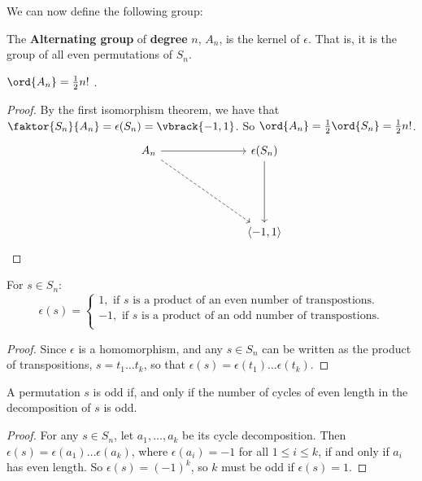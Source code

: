 We can now define the following group:

\begin{definition}
    The \textbf{Alternating group} of \textbf{degree} $n$,  $A_n$, is the kernel
    of  $\epsilon$. That is, it is the group of all even permutations of $S_n$.
\end{definition}

\begin{lemma}\label{3.6.4}
   $\ord{A_n}=\frac{1}{2}n!$ .
\end{lemma}
\begin{proof}
    By the first isomorphism theorem, we have that
    $\faktor{S_n}{A_n}=\epsilon(S_n)=\vbrack{-1,1}$. So
    $\ord{A_n}=\frac{1}{2}\ord{S_n}=\frac{1}{2}n!$.
\[\begin{tikzcd}
	{A_n} &&& {\epsilon(S_n)} \\
	\\
	\\
	&&& {\langle -1, 1 \rangle}
	\arrow[from=1-1, to=1-4]
	\arrow[from=1-4, to=4-4]
	\arrow[dashed, from=1-1, to=4-4]
\end{tikzcd}\]
\end{proof}
\begin{corollary}
    For $s \in S_n$:
    \begin{equation*}
        \epsilon(s)=\begin{cases}
                1, \text{ if } s \text{ is a product of an even number of
                transpostions.} \\
               -1, \text{ if } s \text{ is a product of an odd number of
               transpostions.} \\
             \end{cases}
    \end{equation*}
\end{corollary}
\begin{proof}
    Since $\epsilon$ is a homomorphism, and any $s \in S_n$ can be written as
    the product of transpositions, $s=t_1 \dots t_k$, so that
    $\epsilon(s)=\epsilon(t_1) \dots \epsilon(t_k)$.
\end{proof}

\begin{lemma}\label{3.6.5}
    A permutation $s$ is odd if, and only if the number of cycles of even length
    in the decomposition of $s$ is odd.
\end{lemma}
\begin{proof}
    For any $s \in S_n$, let  $a_1, \dots, a_k$ be its cycle decomposition. Then
    $\epsilon(s)=\epsilon(a_1) \dots \epsilon(a_k)$, where $\epsilon(a_i)=-1$
    for all $1 \leq i \leq k$, if and only if $a_i$ has even length. So
    $\epsilon(s)=(-1)^k$, so $k$ must be odd if  $\epsilon(s)=1$.
\end{proof}

